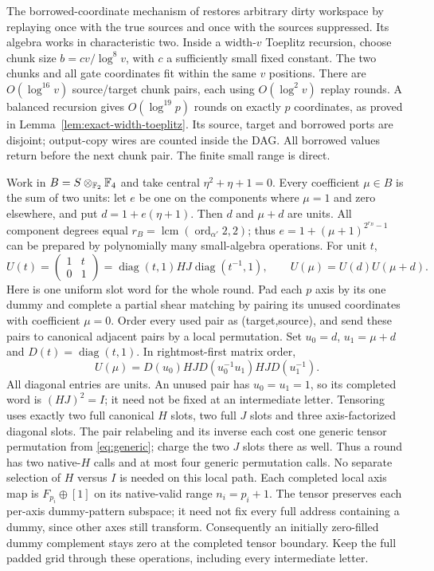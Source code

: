The borrowed-coordinate mechanism of \cite{local} restores arbitrary
dirty workspace by replaying once with the true sources and once with
the sources suppressed. Its algebra works in characteristic two.
Inside a width-$v$ Toeplitz recursion, choose chunk size
$b=c v/\log^8v$, with $c$ a sufficiently small fixed constant. The
two chunks and all gate coordinates fit within the same $v$ positions.
There are $O(\log^{16}v)$ source/target chunk pairs, each using
$O(\log^2v)$ replay rounds. A balanced recursion gives
$O(\log^{19}p)$ rounds on exactly $p$ coordinates, as proved in
Lemma~\ref{lem:exact-width-toeplitz}. Its source, target and borrowed
ports are disjoint; output-copy wires are counted inside the DAG.
All borrowed values
return before the next chunk pair. The finite small range is direct.

Work in $B=S\otimes_{\mathbb F_2}\mathbb F_4$ and take central
$\eta^2+\eta+1=0$. Every coefficient $\mu\in B$ is the sum of two
units: let $e$ be one on the components where $\mu=1$ and zero
elsewhere, and put $d=1+e(\eta+1)$. Then $d$ and $\mu+d$ are units.
All component degrees equal $r_B=\operatorname{lcm}(\operatorname{ord}_{\alpha'}2,2)$;
thus $e=1+(\mu+1)^{2^{r_B}-1}$ can be prepared by polynomially many
small-algebra operations. For unit $t$,
\[
 U(t)=\begin{pmatrix}1&t\\0&1\end{pmatrix}
 =\operatorname{diag}(t,1)HJ\operatorname{diag}(t^{-1},1),
 \qquad U(\mu)=U(d)U(\mu+d).
\]
Here is one uniform slot word for the whole round. Pad each $p$ axis
by its one dummy and complete a partial shear matching by pairing
its unused coordinates with coefficient $\mu=0$. Order every used
pair as (target,source), and send these pairs to canonical adjacent
pairs by a local permutation. Set $u_0=d$, $u_1=\mu+d$ and
$D(t)=\operatorname{diag}(t,1)$. In rightmost-first matrix order,
\[
 U(\mu)=D(u_0)HJ D(u_0^{-1}u_1)HJ D(u_1^{-1}).
\]
All diagonal entries are units. An unused pair has $u_0=u_1=1$,
so its completed word is $(HJ)^2=I$; it need not be fixed at an
intermediate letter. Tensoring uses exactly two full canonical $H$
slots, two full $J$ slots and three axis-factorized diagonal slots.
The pair relabeling and its inverse each cost one generic tensor
permutation from \eqref{eq:generic}; charge the two $J$ slots there
as well. Thus a round has two native-$H$ calls and at most four
generic permutation calls. No separate selection of $H$ versus $I$
is needed on this local path. Each completed local axis map is
$F_{p_i}\oplus[1]$ on its native-valid range $n_i=p_i+1$.
The tensor preserves each per-axis dummy-pattern subspace; it need
not fix every full address containing a dummy, since other axes still
transform. Consequently an initially zero-filled dummy complement
stays zero at the completed tensor boundary. Keep the full padded
grid through these operations, including every intermediate letter.

